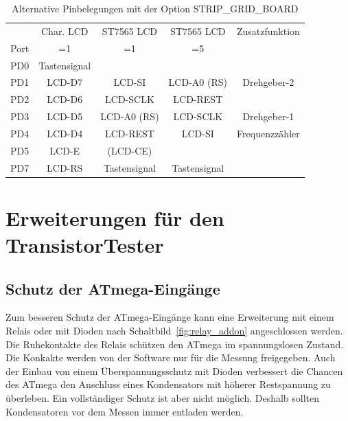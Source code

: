 \begin{table}[H]
  \begin{center}
    \begin{tabular}{| c || c | c | c | c |}
    \hline
           & Char. LCD      & ST7565 LCD     & ST7565 LCD   & Zusatzfunktion \\
      Port &    =1          &    =1          &    =5        &  \\
    \hline
    \hline
    PD0    &  Tastensignal  &                &              &  \\
    \hline
    PD1    &  LCD-D7        & LCD-SI         &  LCD-A0 (RS) &  Drehgeber-2 \\
    \hline
    PD2    &  LCD-D6        & LCD-SCLK       &  LCD-REST    &  \\
    \hline
    PD3    &  LCD-D5        & LCD-A0 (RS)    &  LCD-SCLK    &  Drehgeber-1 \\
    \hline
    PD4    &  LCD-D4        & LCD-REST       &  LCD-SI      &  Frequenzzähler \\
    \hline
    PD5    &  LCD-E         & (LCD-CE)       &              &  \\
    \hline
    PD7    & LCD-RS         & Tastensignal   & Tastensignal &  \\
    \hline
    \end{tabular}
  \end{center}
  \caption{Alternative Pinbelegungen mit der Option STRIP\_GRID\_BOARD}
  \label{tab:grid-change}
\end{table}

\section{Erweiterungen für den TransistorTester}


\subsection{Schutz der ATmega-Eingänge}  

Zum besseren Schutz der ATmega-Eingänge kann eine Erweiterung mit einem Relais oder mit Dioden
nach Schaltbild~\ref{fig:relay_addon} angeschlossen werden.
Die Ruhekontakte des Relais schützen den ATmega im spannungslosen Zustand.
Die Konkakte werden von der Software nur für die Messung freigegeben.
Auch der Einbau von einem Überspannungsschutz mit Dioden verbessert die Chancen des ATmega
den Anschluss eines Kondensators mit höherer Restspannung zu überleben.
Ein vollständiger Schutz ist aber nicht möglich. Deshalb sollten Kondensatoren vor dem Messen immer
entladen werden.

